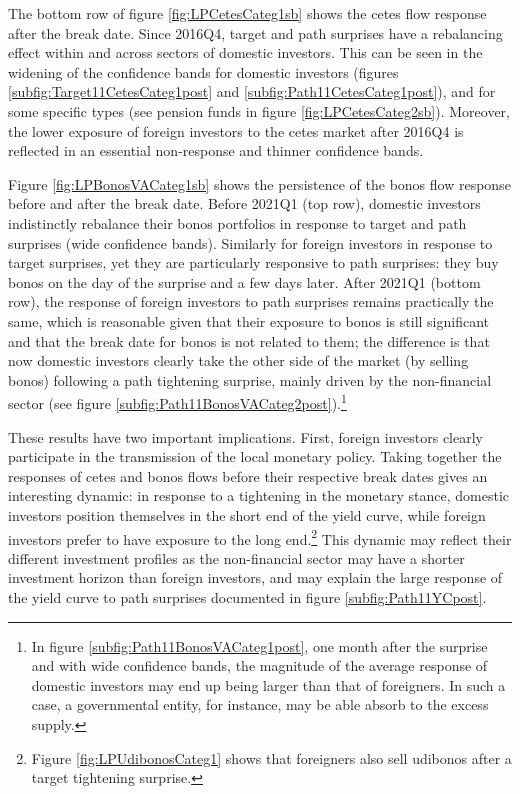 \documentclass[a4paper, 12pt]{article}
\begin{document}
The bottom row of figure \ref{fig:LPCetesCateg1sb} shows the cetes flow response after the break date. 
Since 2016Q4, target and path surprises have a rebalancing effect within and across sectors of domestic investors. This can be seen in the widening of the confidence bands for domestic investors (figures \ref{subfig:Target11CetesCateg1post} and \ref{subfig:Path11CetesCateg1post}), and for some specific types (see pension funds in figure \ref{fig:LPCetesCateg2sb}). Moreover, the lower exposure of foreign investors to the cetes market after 2016Q4 is reflected in an essential non-response and thinner confidence bands.

Figure \ref{fig:LPBonosVACateg1sb} shows the persistence of the bonos flow response before and after the break date. 
Before 2021Q1 (top row), domestic investors indistinctly rebalance their bonos portfolios in response to target and path surprises (wide confidence bands). Similarly for foreign investors in response to target surprises, yet they are particularly responsive to path surprises: they buy bonos on the day of the surprise and a few days later. 
After 2021Q1 (bottom row), the response of foreign investors to path surprises remains practically the same, which is reasonable given that their exposure to bonos is still significant and that the break date for bonos is not related to them; the difference is that now domestic investors clearly take the other side of the market (by selling bonos) following a path tightening surprise, mainly driven by the non-financial sector (see figure \ref{subfig:Path11BonosVACateg2post}).\footnote{In figure \ref{subfig:Path11BonosVACateg1post}, one month after the surprise and with wide confidence bands, the magnitude of the average response of domestic investors may end up being larger than that of foreigners. In such a case, a governmental entity, for instance, may be able absorb to the excess supply.}

These results have two important implications. First, foreign investors clearly participate in the transmission of the local monetary policy. 
Taking together the responses of cetes and bonos flows before their respective break dates gives an interesting dynamic: in response to a tightening in the monetary stance, domestic investors position themselves in the short end of the yield curve, while foreign investors prefer to have exposure to the long end.\footnote{Figure \ref{fig:LPUdibonosCateg1} shows that foreigners also sell udibonos after a target tightening surprise.} 
This dynamic may reflect their different investment profiles as the non-financial sector may have a shorter investment horizon than foreign investors, and may explain the large response of the yield curve to path surprises documented in figure \ref{subfig:Path11YCpost}. 
\end{document}
